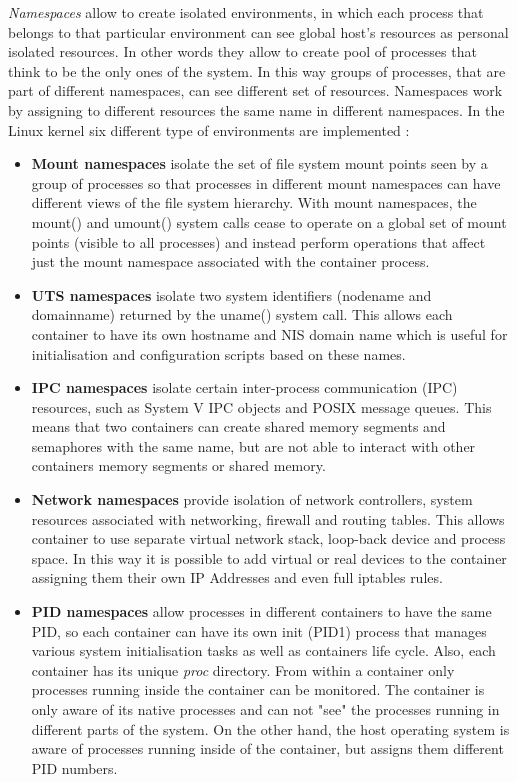\documentclass[a4paper,12pt]{article}
\begin{document}
\textit{Namespaces} allow to create isolated environments, in which each process
that belongs to that particular environment can see global host's resources as
personal isolated resources. In other words they allow to create pool of
processes that think to be the only ones of the system. In this way groups of
processes, that are part of different namespaces, can see different set of
resources. Namespaces work by assigning to different resources the same name in
different namespaces. In the Linux kernel six different type of environments are
implemented \cite{red_hat_introduction_to_namespaces}:
  \begin{itemize}
    \item \textbf{Mount namespaces} isolate the set of file system mount points
    seen by a group of processes so that processes in different mount namespaces
    can have different views of the file system hierarchy. With mount
    namespaces, the mount() and umount() system calls cease to operate on a
    global set of mount points (visible to all processes) and instead perform
    operations that affect just the mount namespace associated with the
    container process. 
    \item \textbf{UTS namespaces} isolate two system identifiers (nodename and
    domainname) returned by the uname() system call. This allows each container
    to have its own hostname and NIS domain name which is useful for
    initialisation and configuration scripts based on these names. 
    \item \textbf{IPC namespaces} isolate certain inter-process communication
    (IPC) resources, such as System V IPC objects and POSIX message queues. This
    means that two containers can create shared memory segments and semaphores
    with the same name, but are not able to interact with other containers
    memory segments or shared memory. 
    \item \textbf{Network namespaces} provide isolation of network controllers,
    system resources associated with networking, firewall and routing tables.
    This allows container to use separate virtual network stack, loop-back device
    and process space. In this way it is possible to add virtual or real devices
    to the container assigning them their own IP Addresses and even full iptables
    rules. 
    \item \textbf{PID namespaces} allow processes in different containers to
    have the same PID, so each container can have its own init (PID1) process
    that manages various system initialisation tasks as well as containers life
    cycle. Also, each container has its unique \textit{\/proc} directory. From
    within a container only processes running inside the container can be
    monitored. The container is only aware of its native processes and can not
    "see" the processes running in different parts of the system. On the other
    hand, the host operating system is aware of processes running inside of the
    container, but assigns them different PID numbers.
  \end{itemize} 
\end{document}

